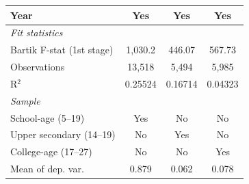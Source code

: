 \begin{tabular}{lccc}
   Year                                                                  & Yes                                & Yes                                     & Yes\\  
   \midrule
   \emph{Fit statistics}\\
   Bartik F-stat (1st stage)                                     & 1,030.2                            & 446.07                                  & 567.73\\  
   Observations                                                          & 13,518                             & 5,494                                   & 5,985\\  
   R$^2$                                                                 & 0.25524                            & 0.16714                                 & 0.04323\\  
\midrule
\emph{Sample}\\
School-age (5--19) & Yes & No & No   \\   
Upper secondary (14--19) & No & Yes & No   \\   
College-age (17--27) & No & No & Yes   \\   
   Mean of dep. var.                                                     & 0.879                              & 0.062                                   & 0.078\\  
\bottomrule
\end{tabular}
